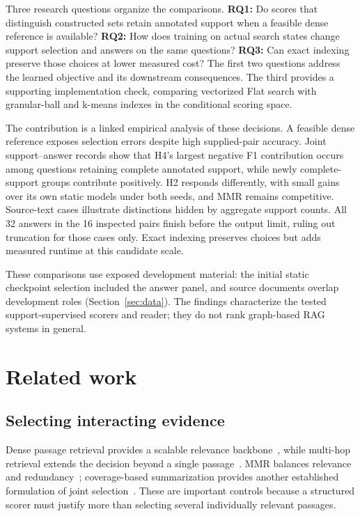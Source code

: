 \documentclass[preprint,12pt]{elsarticle}
\begin{document}
\FloatBarrier
Three research questions organize the comparisons. \textbf{RQ1:} Do scores that distinguish constructed sets retain annotated support when a feasible dense reference is available? \textbf{RQ2:} How does training on actual search states change support selection and answers on the same questions? \textbf{RQ3:} Can exact indexing preserve those choices at lower measured cost? The first two questions address the learned objective and its downstream consequences. The third provides a supporting implementation check, comparing vectorized Flat search with granular-ball and k-means indexes in the conditional scoring space.

The contribution is a linked empirical analysis of these decisions. A feasible dense reference exposes selection errors despite high supplied-pair accuracy. Joint support--answer records show that H4's largest negative F1 contribution occurs among questions retaining complete annotated support, while newly complete-support groups contribute positively. H2 responds differently, with small gains over its own static models under both seeds, and MMR remains competitive. Source-text cases illustrate distinctions hidden by aggregate support counts. All 32 answers in the 16 inspected pairs finish before the output limit, ruling out truncation for those cases only. Exact indexing preserves choices but adds measured runtime at this candidate scale.

These comparisons use exposed development material: the initial static checkpoint selection included the answer panel, and source documents overlap development roles (Section~\ref{sec:data}). The findings characterize the tested support-supervised scorers and reader; they do not rank graph-based RAG systems in general.

\section{Related work}
\subsection{Selecting interacting evidence}
Dense passage retrieval provides a scalable relevance backbone~\cite{karpukhin2020dpr}, while multi-hop retrieval extends the decision beyond a single passage~\cite{xiong2021mdr}. MMR balances relevance and redundancy~\cite{carbonell1998mmr}; coverage-based summarization provides another established formulation of joint selection~\cite{lin2011submodular}. These are important controls because a structured scorer must justify more than selecting several individually relevant passages.
\end{document}
